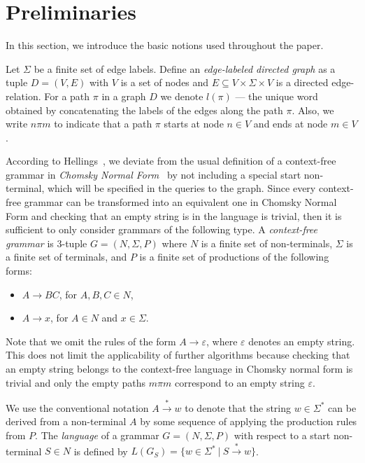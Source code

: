 \section{Preliminaries} \label{section_preliminaries}
In this section, we introduce the basic notions used throughout the paper.

Let $\Sigma$ be a finite set of edge labels. Define an \textit{edge-labeled directed graph} as a tuple $D = (V, E)$ with $V$ is a set of nodes and $E \subseteq V \times \Sigma \times V$ is a directed edge-relation.  For a path $\pi$ in a graph $D$ we denote $l(\pi)$ --- the unique word obtained by concatenating the labels of the edges along the path $\pi$. Also, we write $n \pi m$ to indicate that a path $\pi$ starts at node $n \in V$ and ends at node $m \in V$.

According to Hellings~\cite{hellingsRelational}, we deviate from the usual definition of a context-free grammar in \textit{Chomsky Normal Form}~\cite{chomsky} by not including a special start non-terminal, which will be specified in the queries to the graph. Since every context-free grammar can be transformed into an equivalent one in Chomsky Normal Form and checking that an empty string is in the language is trivial, then it is sufficient to only consider grammars of the following type. A \textit{context-free grammar} is 3-tuple $G = (N, \Sigma, P)$ where $N$ is a finite set of non-terminals, $\Sigma$ is a finite set of terminals, and $P$ is a finite set of productions of the following forms:

\begin{itemize}
    \item $A \rightarrow B C$, for $A,B,C \in N$,
    \item $A \rightarrow x$, for $A \in N$ and $x \in \Sigma$.   
\end{itemize}

Note that we omit the rules of the form $A \rightarrow \varepsilon$, where $\varepsilon$ denotes an empty string. This does not limit the applicability of further algorithms because checking that an empty string belongs to the context-free language in Chomsky normal form is trivial and only the empty paths $m \pi m$ correspond to an empty string $\varepsilon$.

We use the conventional notation $A \xrightarrow{*} w$ to denote that the string $w \in \Sigma^*$ can be derived from a non-terminal $A$ by some sequence of applying the production rules from $P$. The \textit{language} of a grammar $G = (N,\Sigma,P)$ with respect to a start non-terminal $S \in N$ is defined by $L(G_S) = \{w \in \Sigma^*~|~S \xrightarrow{*} w\}$.

